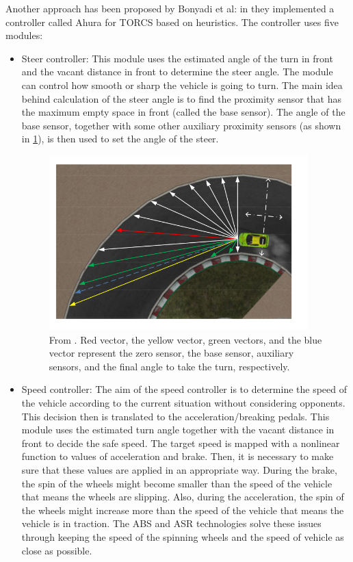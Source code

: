 Another approach has been proposed by Bonyadi et al: in \cite{ahura} they implemented a controller called Ahura for TORCS based on heuristics.
The controller uses five modules: 
\begin{itemize}
\item Steer controller: This module uses the estimated angle
of the turn in front and the vacant distance in front to determine the steer angle. The module can control how smooth or sharp the vehicle is going to turn.
The main idea behind calculation of the steer angle is to find the proximity sensor that has the maximum empty space in front (called the base sensor). The angle of the base sensor, together with some other auxiliary proximity sensors (as shown in \ref{fig:ahura-steer}), is then used to set the angle of the steer.
\begin{figure}
 \centering
  \captionsetup{width=10cm}
  \includegraphics[width=10cm]{./img/ahura-steer}
  \caption{From \cite{ahura}. Red vector, the yellow vector, green vectors, and the blue vector represent the zero sensor, the base sensor, auxiliary sensors, and the final angle to take the turn, respectively.}
   \label{fig:ahura-steer}
\end{figure}
\item Speed controller: The aim of the speed controller is to determine the speed of the vehicle according to the current situation without considering opponents. This decision then is translated to the acceleration/breaking pedals. This module uses the estimated turn angle together with the vacant distance in front to decide the safe speed.
The target speed is mapped with a nonlinear function to values of acceleration and brake. Then, it is necessary to make sure that these values are applied in an appropriate way.  During the brake, the spin of the wheels might become smaller than the speed of the vehicle that
means the wheels are slipping. Also, during the acceleration, the spin of the wheels might increase more than the speed of the vehicle that means the vehicle is in traction. The ABS and ASR technologies solve these issues through keeping the speed of the spinning wheels and the speed of vehicle as close as possible.

\end{itemize}
